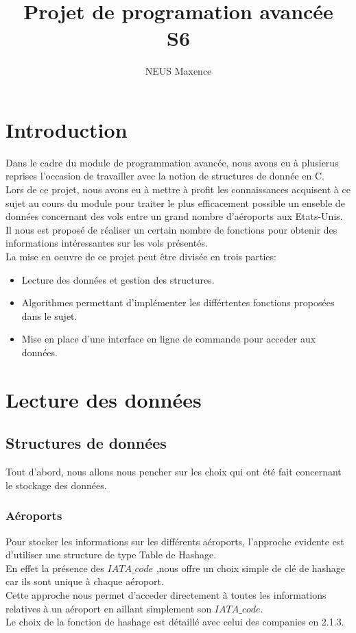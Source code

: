 \documentclass[a4paper, 12pt]{article}
\begin{document}
	\title{Projet de programation avancée\\S6}
	\author{NEUS Maxence}
	\maketitle
	\newpage
	
	\tableofcontents
	\newpage
	
	\section{Introduction}
	Dans le cadre du module de programmation avancée, nous avons eu à plusierus reprises l'occasion de travailler avec la notion de structures de donnée en C.\\
	Lors de ce projet, nous avons eu à mettre à profit les connaissances acquisent à ce sujet au cours du module pour traiter le plus efficacement possible un enseble de données concernant des vols entre un grand nombre d'aéroports aux Etats-Unis. Il nous est proposé de réaliser un certain nombre de fonctions pour obtenir des informations intéressantes sur les vols présentés.\\
	La mise en oeuvre de ce projet peut être divisée en trois parties: 
	\begin{itemize}
		\item Lecture des données et gestion des structures.
		\item Algorithmes permettant d'implémenter les différtentes fonctions proposées dans le sujet.
		\item Mise en place d'une interface en ligne de commande pour acceder aux données.
	\end{itemize}

	\section{Lecture des données}
	\subsection{Structures de données}
	Tout d'abord, nous allons nous pencher sur les choix qui ont été fait concernant le stockage des données.
	\subsubsection{Aéroports}
	Pour stocker les informations sur les différents aéroports, l'approche evidente est d'utiliser une structure de type Table de Hashage.\\
	En effet la présence des $IATA\_code$ ,nous offre un choix simple de clé de hashage car ils sont unique à chaque aéroport.\\
	Cette approche nous permet d'acceder directement à toutes les informations relatives à un aéroport en aillant simplement son $IATA\_code$.\\
	Le choix de la fonction de hashage est détaillé avec celui des companies en 2.1.3.\\
	
\end{document}
